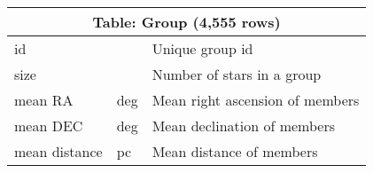 \begin{table}[htb]
\begin{tabular}{l|l|l}
\hline
\multicolumn{3}{c}{Table: Group (4,555 rows)}                                         \\
\hline
id            &        & Unique group id                     \\
size          &        & Number of stars in a group          \\
mean RA       &  deg   & Mean right ascension of members     \\
mean DEC      &  deg   & Mean declination of members     \\
mean distance &  pc    & Mean distance of members     \\
\hline\hline
\end{tabular}
\end{table}
